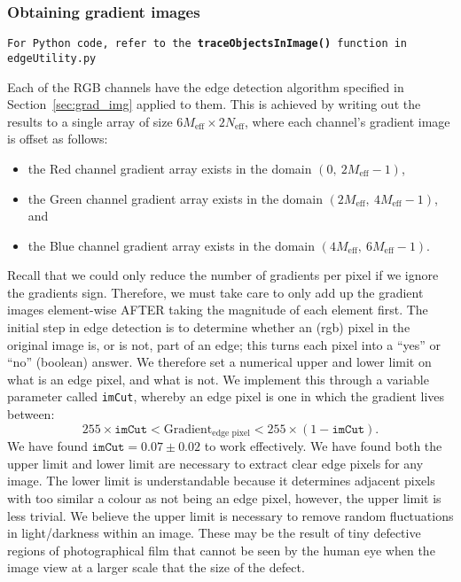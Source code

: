 \documentclass[11pt]{article}
\begin{document}
\subsubsection{Obtaining gradient images}
\begin{center}
\texttt{For Python code, refer to the {\bf traceObjectsInImage()} function in edgeUtility.py}
\end{center}
Each of the RGB channels have the edge detection algorithm specified in Section~\ref{sec:grad_img} applied to them. This is achieved by writing out the results to a single array of size $6M_{\text{eff}} \times 2N_{\text{eff}}$, where each channel's gradient image is offset as follows:
\begin{itemize}
  \item the Red channel gradient array exists in the domain $(0,~2M_{\text{eff}}-1)$,
  \item the Green channel gradient array exists in the domain $(2M_{\text{eff}},~4M_{\text{eff}}-1)$, and
  \item the Blue channel gradient array exists in the domain $(4M_{\text{eff}},~6M_{\text{eff}}-1)$.
\end{itemize}
Recall that we could only reduce the number of gradients per pixel if we ignore the gradients sign. Therefore, we must take care to only add up the gradient images element-wise AFTER taking the magnitude of each element first. The initial step in edge detection is to determine whether an (rgb) pixel in the original image is, or is not, part of an edge; this turns each pixel into a ``yes'' or ``no'' (boolean) answer. We therefore set a numerical upper and lower limit on what is an edge pixel, and what is not. We implement this through a variable parameter called \texttt{imCut}, whereby an edge pixel is one in which the gradient lives between:
\begin{equation}
255\times \texttt{imCut}< \text{Gradient}_{\text{edge pixel}} < 255\times (1-\texttt{imCut})\text{.}
\end{equation}
We have found $\texttt{imCut} = 0.07 \pm 0.02$ to work effectively. We have found both the upper limit and lower limit are necessary to extract clear edge pixels for any image. The lower limit is understandable because it determines adjacent pixels with too similar a colour as not being an edge pixel, however, the upper limit is less trivial. We believe the upper limit is necessary to remove random fluctuations in light/darkness within an image. These may be the result of tiny defective regions of photographical film that cannot be seen by the human eye when the image view at a larger scale that the size of the defect.
\end{document}
